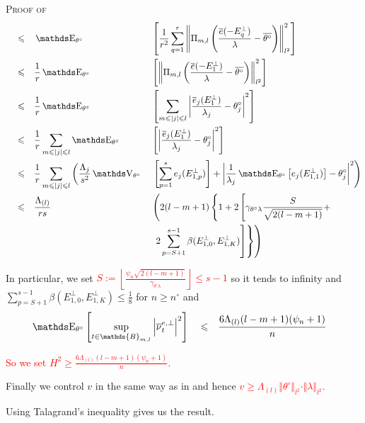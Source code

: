 \begin{pro}{\textsc{Proof of }\\}
\begin{alignat*}{4}
& && \leq && \E_{\theta^{\circ}}&&\left[\frac{1}{r^{2}} \sum\limits_{q = 1}^{r} \left\Vert \Pi_{m, l}\left(\frac{\overline{e}(-E^{\perp}_{q})}{\lambda} - \overline{\theta^{\circ}} \right)\right\Vert_{l^{2}}^{2}\right]\\
& && \leq && \frac{1}{r}\E_{\theta^{\circ}}&&\left[ \left\Vert \Pi_{m, l}\left(\frac{\overline{e}(-E^{\perp}_{1})}{\lambda} - \overline{\theta^{\circ}}\right) \right\Vert_{l^{2}}^{2}\right]\\
& && \leq && \frac{1}{r}\E_{\theta^{\circ}}&&\left[ \sum\limits_{m \leq \vert j \vert \leq l} \left\vert \frac{\overline{e}_{j}(E^{\perp}_{1})}{\lambda_{j}} - \theta^{\circ}_{j} \right\vert^{2} \right]\\
& && \leq && \frac{1}{r} \sum\limits_{m \leq \vert j \vert \leq l} \E_{\theta^{\circ}}&&\left[ \left\vert \frac{\overline{e}_{j}(E^{\perp}_{1})}{\lambda_{j}} - \theta^{\circ}_{j} \right\vert^{2} \right]\\
& && \leq && \frac{1}{r} \sum\limits_{m \leq \vert j \vert \leq l}\left( \frac{\Lambda_{j}}{s^{2}}\V_{\theta^{\circ}}\right. && \left.\left[ \sum\limits_{p = 1}^{s} e_{j}(E^{\perp}_{1, p}) \right] + \left\vert \frac{1}{\lambda_{j}} \E_{\theta^{\circ}}\left[ e_{j}(E^{\perp}_{1, 1})\right] - \theta^{\circ}_{j} \right\vert^{2}\right)\\
& && \leq && \frac{\Lambda_{(l)}}{r s} &&\left(2(l-m+1) \left\{1 + 2 \left[\gamma_{\theta^{\circ} \lambda}\frac{S}{\sqrt{2(l-m+1)}} +\right.\right.\right. \\
& && && && \left.\left.\left. 2 \sum\limits_{p = S+1}^{s-1} \beta(E^{\perp}_{1, 0},E^{\perp}_{1, K})\right]\right\}\right)
\end{alignat*}

In particular, we set \textcolor{red}{$S := \left\lfloor \frac{\psi_{n} \sqrt{2 \left(l - m + 1\right)}}{\gamma_{\theta^{\circ} \lambda}} \right\rfloor \leq s-1$} so it tends to infinity and $\sum\limits_{p = S+1}^{s-1} \beta(E^{\perp}_{1, 0},E^{\perp}_{1, K}) \leq \frac{1}{8}$ for $n \geq n^{\circ}$ and 
\begin{alignat*}{3}
& \E_{\theta^{\circ}}\left[\sup\limits_{t \in \mathds{B}_{m,l}} \left\vert \overline{\nu}^{e, \perp}_{t}\right\vert^{2}\right] && \leq && \frac{6 \Lambda_{(l)}(l-m+1)( \psi_{n} + 1)}{n}
\end{alignat*}

\textcolor{red}{So we set $H^{2} \geq \frac{6 \Lambda_{(l)}(l-m+1)( \psi_{n} + 1)}{n}$.}


Finally we control $v$ in the same way as in  and hence \textcolor{red}{$v \geq \Lambda_{(l)} \Vert \theta^{\circ} \Vert_{l^{2}} \cdot \Vert \lambda \Vert_{l^{2}}$.}

Using Talagrand's inequality gives us the result.

\qedsymbol
\end{pro}




